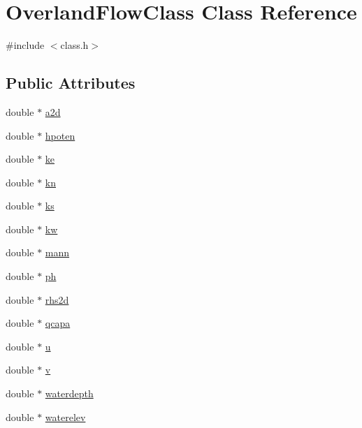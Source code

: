 \hypertarget{class_overland_flow_class}{}\section{Overland\+Flow\+Class Class Reference}
\label{class_overland_flow_class}


{\ttfamily \#include $<$class.\+h$>$}

\subsection*{Public Attributes}
\begin{DoxyCompactItemize}
\item 
double $\ast$ \hyperlink{class_overland_flow_class_ae9d7af57fca60e593a9ade48f8391af9}{a2d}
\item 
double $\ast$ \hyperlink{class_overland_flow_class_a39c373082e2f92e84e113696dc52fc18}{hpoten}
\item 
double $\ast$ \hyperlink{class_overland_flow_class_a264f705f6afb4165e034f03a9b8524d3}{ke}
\item 
double $\ast$ \hyperlink{class_overland_flow_class_a42b1be6154c01a8b1d3d8d80b2778a8b}{kn}
\item 
double $\ast$ \hyperlink{class_overland_flow_class_af881398641bfe14181b0f660dcbdcb58}{ks}
\item 
double $\ast$ \hyperlink{class_overland_flow_class_ab7e1afd83d8f02e5a1fc4396e4823736}{kw}
\item 
double $\ast$ \hyperlink{class_overland_flow_class_ac0a8dc0d442c788c4e9ba79c8b3da252}{mann}
\item 
double $\ast$ \hyperlink{class_overland_flow_class_a9ae3aaddc7b3f3a3426347661c48f7fa}{ph}
\item 
double $\ast$ \hyperlink{class_overland_flow_class_aae7a3ccb69c2ebfa5bbe138989c1706f}{rhs2d}
\item 
double $\ast$ \hyperlink{class_overland_flow_class_a39b5113a4c983360ecc75165db1f0b7b}{qcapa}
\item 
double $\ast$ \hyperlink{class_overland_flow_class_a45052cd1169977eaacaca7ffed5505e3}{u}
\item 
double $\ast$ \hyperlink{class_overland_flow_class_a9a93088261b1d6f3c69711d34b6506b3}{v}
\item 
double $\ast$ \hyperlink{class_overland_flow_class_aa27e2a9ff30216b25788568271f09b0c}{waterdepth}
\item 
double $\ast$ \hyperlink{class_overland_flow_class_ab1766529cb5c8c0913e0d81a356c9898}{waterelev}

\end{DoxyCompactItemize}

